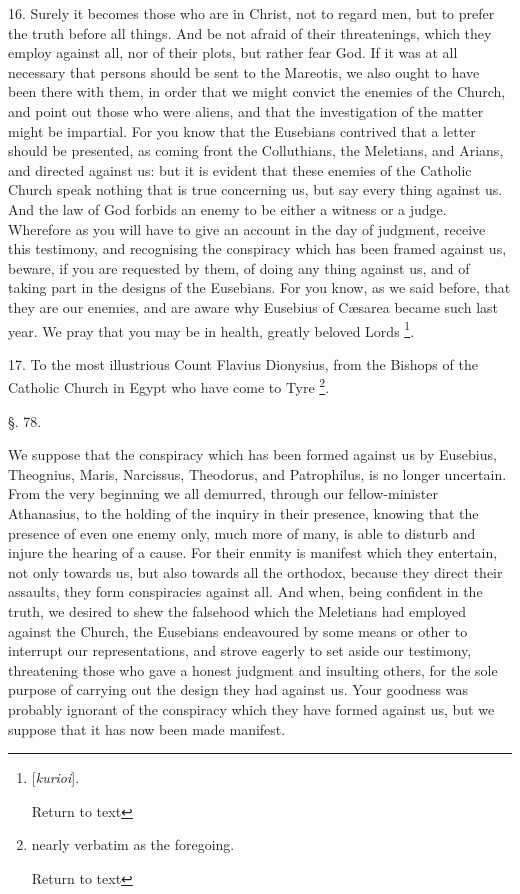 16. Surely it becomes those who are in Christ,
not to regard men, but to prefer the truth before all things. And be
not afraid of their threatenings, which they employ against all, nor
of their plots, but rather fear God. If it was at all necessary that
persons should be sent to the Mareotis, we also ought to have been
there with them, in order that we might convict the enemies of the
Church, and point out those who were aliens, and that the
investigation of the matter might be impartial. For you know that the
Eusebians contrived that a letter should be presented, as coming front
the Colluthians, the Meletians, and Arians, and directed against us:
but it is evident that these enemies of the Catholic Church speak
nothing that is true concerning us, but say every thing against us.
And the law of God forbids an enemy to be either a witness or a judge.
Wherefore as you will have to give an account in the day of judgment,
receive this testimony, and recognising the conspiracy which has been
framed against us, beware, if you are requested by them, of doing any
thing against us, and of taking part in the designs of the Eusebians.
For you know, as we said before, that they are our enemies, and are
aware why Eusebius of Cæsarea became such last year. We pray that you
may be in health, greatly beloved Lords \footnote{[\emph{kurioi}].

Return to text}.

17. To the most illustrious Count Flavius
Dionysius, from the Bishops of the Catholic Church in Egypt who have
come to Tyre \footnote{nearly verbatim as the foregoing.

Return to text}.

§. 78.

We suppose that the conspiracy which has been
formed against us by Eusebius, Theognius, Maris, Narcissus, Theodorus,
and Patrophilus, is no longer uncertain. From the very beginning we
all demurred, through our fellow-minister Athanasius, to the holding
of the inquiry in their presence, knowing that the presence of even
one enemy only, much more of many, is able to disturb and injure the
hearing of a cause. For their enmity is manifest which they entertain,
not only towards us, but also towards all the orthodox, because they
direct their assaults, they form conspiracies against all. And when,
being confident in the truth, we desired to shew the falsehood which
the Meletians had employed against the Church, the Eusebians
endeavoured by some means or other to interrupt our representations,
and strove eagerly to set aside our testimony, threatening those who
gave a honest judgment and insulting others, for the sole purpose of
carrying out the design they had against us. Your goodness was
probably ignorant of the conspiracy which they have formed against us,
but we suppose that it has now been made manifest.

